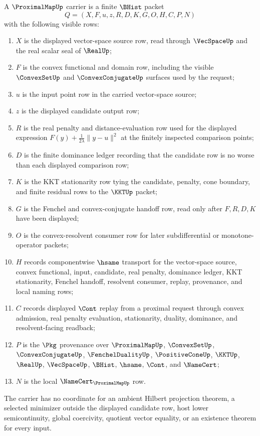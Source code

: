 \begin{definition}
\label{def:proximal-map-carrier}
A $\ProximalMapUp$ carrier is a finite $\BHist$ packet
$$
Q=(X,F,u,z,R,D,K,G,O,H,C,P,N)
$$
with the following visible rows:
\begin{enumerate}
\item $X$ is the displayed vector-space source row, read through $\VecSpaceUp$ and the real scalar seal of $\RealUp$;
\item $F$ is the convex functional and domain row, including the visible $\ConvexSetUp$ and $\ConvexConjugateUp$ surfaces used by the request;
\item $u$ is the input point row in the carried vector-space source;
\item $z$ is the displayed candidate output row;
\item $R$ is the real penalty and distance-evaluation row used for the displayed expression $F(y)+\frac{1}{2\lambda}\lVert y-u\rVert^2$ at the finitely inspected comparison points;
\item $D$ is the finite dominance ledger recording that the candidate row is no worse than each displayed comparison row;
\item $K$ is the KKT stationarity row tying the candidate, penalty, cone boundary, and finite residual rows to the $\KKTUp$ packet;
\item $G$ is the Fenchel and convex-conjugate handoff row, read only after $F,R,D,K$ have been displayed;
\item $O$ is the convex-resolvent consumer row for later subdifferential or monotone-operator packets;
\item $H$ records componentwise $\hsame$ transport for the vector-space source, convex functional, input, candidate, real penalty, dominance ledger, KKT stationarity, Fenchel handoff, resolvent consumer, replay, provenance, and local naming rows;
\item $C$ records displayed $\Cont$ replay from a proximal request through convex admission, real penalty evaluation, stationarity, duality, dominance, and resolvent-facing readback;
\item $P$ is the $\Pkg$ provenance over $\ProximalMapUp$, $\ConvexSetUp$, $\ConvexConjugateUp$, $\FenchelDualityUp$, $\PositiveConeUp$, $\KKTUp$, $\RealUp$, $\VecSpaceUp$, $\BHist$, $\hsame$, $\Cont$, and $\NameCert$;
\item $N$ is the local $\NameCert_{\ProximalMapUp}$ row.
\end{enumerate}
The carrier has no coordinate for an ambient Hilbert projection theorem, a selected minimizer outside the displayed candidate row, host lower semicontinuity, global coercivity, quotient vector equality, or an existence theorem for every input.
\end{definition}

